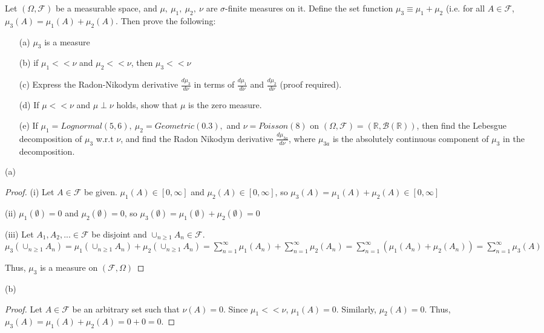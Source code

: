 \documentclass[12pt,letterpaper, onecolumn]{exam}
\newcommand{\real}{\mathbb{R}}
\newcommand{\calF}{\mathcal{F}}
\newcommand{\borel}{\mathcal{B}(\mathbb{R})}
\newcommand{\cutesum}[1]{\sum_{#1 = 1}^\infty}
\begin{document}
\begin{questions}
    Let $(\Omega, \calF)$ be a measurable space, and $\mu, \: \mu_1, \: \mu_2, \: \nu$ are $\sigma$-finite measures on it. Define the set function $\mu_3 \equiv \mu_1 + \mu_2$ (i.e. for all $A \in \calF$, $\mu_3(A) = \mu_1(A) + \mu_2(A)$. Then prove the following: 
    \begin{enumerate}
        \item[(a)] $\mu_3$ is a measure
        \item[(b)] if $\mu_1 << \nu$ and $\mu_2 << \nu$, then $\mu_3 << \nu$ 
        \item[(c)] Express the Radon-Nikodym derivative $\frac{d \mu_3}{d \nu}$ in terms of $\frac{d \mu_1}{d \nu}$  and $\frac{d \mu_2}{d \nu}$ (proof required).
        \item[(d)] If $\mu << \nu$ and $\mu \perp \nu$ holds, show that $\mu$ is the zero measure.
        \item[(e)] If $\mu_1 = Lognormal(5, 6), \: \mu_2 = Geometric(0.3),$ and $\nu = Poisson(8)$ on $(\Omega, \calF) = (\real , \borel)$, then find the Lebesgue decomposition of $\mu_3$ w.r.t $\nu$, and find the Radon Nikodym derivative $\frac{d \mu_{3a}}{d \nu}$, where $\mu_{3a}$ is the absolutely continuous component of $\mu_3$ in the decomposition.
    \end{enumerate}
    
    (a) \begin{proof}
        (i) Let $A \in \calF$ be given. $\mu_1(A) \in [0, \infty]$ and $\mu_2(A) \in [0, \infty]$, so $\mu_3(A) = \mu_1(A) + \mu_2(A) \in [0, \infty]$

        (ii) $\mu_1(\emptyset) = 0$ and $\mu_2(\emptyset) = 0$, so $\mu_3(\emptyset) = \mu_1(\emptyset) + \mu_2(\emptyset) = 0$

        (iii) Let $A_1, A_2, ... \in \calF$ be disjoint and $\cup_{n \geq 1} A_n \in \calF$. \\
        $\mu_3(\cup_{n \geq 1} A_n) = \mu_1(\cup_{n \geq 1} A_n) + \mu_2(\cup_{n \geq 1} A_n) = \cutesum{n} \mu_1(A_n) + \cutesum{n} \mu_2(A_n) = \cutesum{n} (\mu_1(A_n) + \mu_2(A_n)) = \cutesum{n} \mu_3(A)$

        Thus, $\mu_3$ is a measure on $(\calF, \Omega)$
    \end{proof}

    (b) \begin{proof}
        Let $A \in \calF$ be an arbitrary set such that $\nu(A) = 0$. Since $\mu_1 << \nu$, $\mu_1(A) = 0$. Similarly, $\mu_2(A) = 0$. Thus, $\mu_3(A) = \mu_1(A) + \mu_2(A) = 0 + 0 = 0$. 


\end{proof}
\end{questions}
\end{document}
